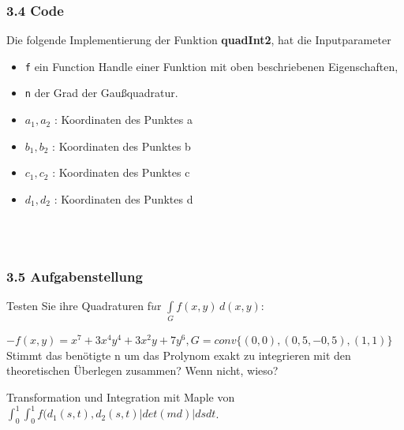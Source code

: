 \documentclass[a4paper,11pt,bibliography=totoc,listof=totoc,headinclude=true,cleardoublepage=empty,oneside]{scrbook}
\newcommand{\code}[1]{\texttt{\color{change}#1}}
\begin{document}
		\subsubsection{3.4 Code}
			Die folgende Implementierung der Funktion \textbf{quadInt2}, hat die Inputparameter
			\begin{itemize}
				\item \code{f} ein Function Handle einer Funktion mit oben beschriebenen Eigenschaften,
				\item \code{n} der Grad der Gaußquadratur.
				\item \code{$a_1,a_2$} : Koordinaten des Punktes a
				\item \code{$b_1,b_2$} : Koordinaten des Punktes b
				\item \code{$c_1,c_2$} : Koordinaten des Punktes c
				\item \code{$d_1,d_2$} : Koordinaten des Punktes d
			\end{itemize} 
		\color{change}
		\lstset{ 
			language=Matlab, 
			showstringspaces=false}
		
		 
		\begin{lstlisting} 
		
		
		\end{lstlisting}
		
		
		
		
		
		\color{change2}
		\subsubsection{3.5 Aufgabenstellung}
		
		 Testen Sie ihre Quadraturen f$\ddot{u}$r $\int \limits_{G} \! f(x,y) \, d(x,y)$:
		
		
		\color{change2}
		
		
		\leftskip=1cm %
		\noindent %
		
			\begin{flushleft}
			$-f(x,y)= x^7+3x^4y^4+3x^2y+7y^6 , G=conv\{(0,0),(0,5,-0,5),(1,1)\}$ \\
			Stimmt das benötigte n um das Prolynom exakt zu integrieren mit den theoretischen Überlegen zusammen? Wenn nicht, wieso?
			
			
			

				
				
		\vspace{5mm}
		Transformation und Integration mit Maple von 
		$\int_{0}^{1}\int_{0}^{1}f(d_1(s,t),d_2(s,t)|det(md)|dsdt$.
		\end{flushleft}
		
\end{document}
